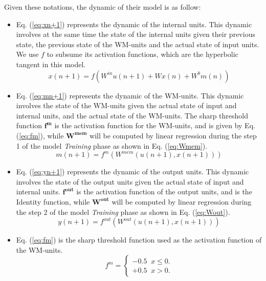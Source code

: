 Given these notations, the dynamic of their model is as follow: 
\begin{itemize}
    \item Eq. (\ref{eq:xn+1}) represents the dynamic of the internal units. This dynamic involves at the same time the state of the internal units given their previous state, the previous state of the WM-units and the actual state of input units. We use $\mathbf{}{f}$ to subsume its activation functions, which are the hyperbolic tangent in this model.
    \begin{equation} \label{eq:xn+1}
        x(n+1) = f(W^{in}u(n+1) + Wx(n) + W^{b}m(n))
    \end{equation}
    
    \item Eq. (\ref{eq:mn+1}) represents the dynamic of the WM-units. This dynamic involves the state of the WM-units given the actual state of input and internal units, and the actual state of the WM-units. The sharp threshold function $\mathbf{f^{m}}$ is the activation function for the WM-units, and is given by Eq. (\ref{eq:fm}), while $\mathbf{W^{mem}}$ will be computed by linear regression during the step 1 of the model \textit{Training} phase as shown in Eq. (\ref{eq:Wmem}).
    \begin{equation} \label{eq:mn+1}
        m(n+1) = f^{m}(W^{mem}(u(n+1), x(n+1)))
    \end{equation}
    
    \item Eq. (\ref{eq:yn+1}) represents the dynamic of the output units. This dynamic involves the state of the output units given the actual state of input and internal units. $\mathbf{f^{out}}$ is the activation function of the output units, and is the Identity function, while $\mathbf{W^{out}}$ will be computed by linear regression during the step 2 of the model \textit{Training} phase as shown in Eq. (\ref{eq:Wout}).
    \begin{equation} \label{eq:yn+1}
        y(n+1) = f^{out}(W^{out}(u(n+1), x(n+1)))
    \end{equation}
    
    \item Eq. (\ref{eq:fm}) is the sharp threshold function used as the activation function of the WM-units.
    \begin{equation} \label{eq:fm}
        f^{m} = \begin{cases}
            -0.5 \; \; x\leq 0. \\
            +0.5 \; \; x>0. \end{cases}
    \end{equation}
    

\end{itemize}
